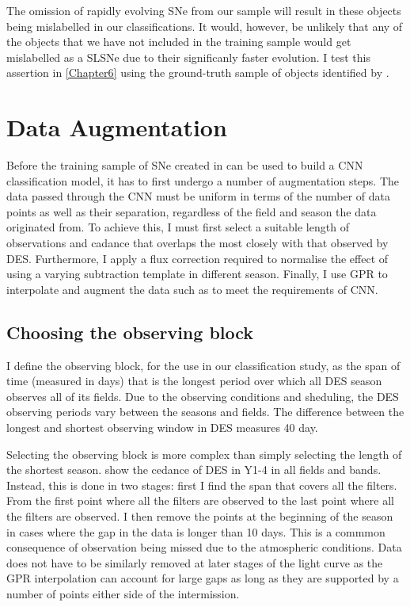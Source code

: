 The omission of rapidly evolving SNe from our sample will result in these objects being mislabelled in our classifications. It would, however, be unlikely that any of the objects that we have not included in the training sample would get mislabelled as a SLSNe due to their significanly faster evolution. I test this assertion in \cref{Chapter6} using the ground-truth sample of objects identified by \citet{Pursiainen2018}.

\section{Data Augmentation} \label{sec:DataAugmentation}
Before the training sample of SNe created in  can be used to build a CNN classification model, it has to first undergo a number of augmentation steps. The data passed through the CNN must be uniform in terms of the number of data points as well as their separation, regardless of the field and season the data originated from. To achieve this, I must first select a suitable length of observations and cadance that overlaps the most closely with that observed by DES. Furthermore, I apply a flux correction required to normalise the effect of using a varying subtraction template in different season. Finally, I use GPR to interpolate and augment the data such as to meet the requirements of CNN.

\subsection{Choosing the observing block} \label{sec:ObsBlock}
I define the observing block, for the use in our classification study, as the span of time (measured in days) that is the longest period over which all DES season observes all of its fields. Due to the observing conditions and sheduling, the DES observing periods vary between the seasons and fields. The difference between the longest and shortest observing window in DES measures 40 day.

Selecting the observing block is more complex than simply selecting the length of the shortest season.  show the cedance of DES in Y1-4 in all fields and bands. Instead, this is done in two stages: first I find the span that covers all the filters. From the first point where all the filters are observed to the last point where all the filters are observed. I then remove the points at the beginning of the season in cases where the gap in the data is longer than 10 days. This is a commmon consequence of observation being missed due to the atmospheric conditions. Data does not have to be similarly removed at later stages of the light curve as the GPR interpolation can account for large gaps as long as they are supported by a number of points either side of the intermission.

